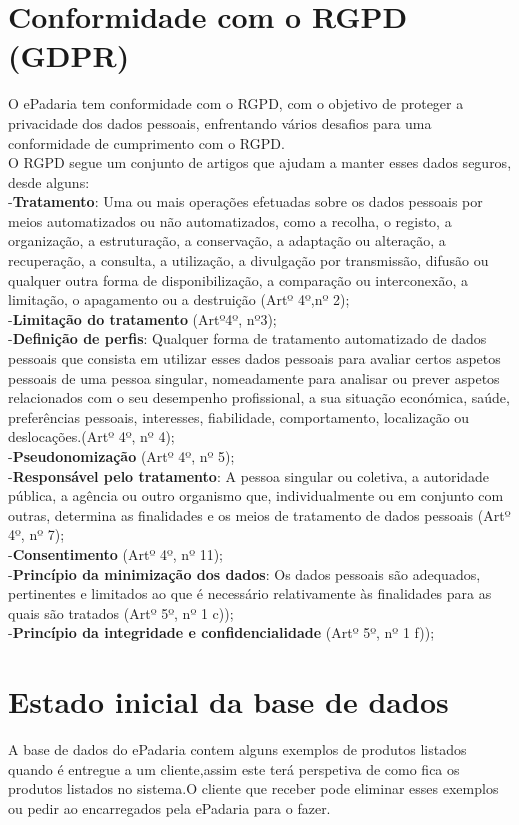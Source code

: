 \section{Conformidade com o RGPD (GDPR)}
O ePadaria tem conformidade com o RGPD, com o objetivo de proteger a privacidade dos dados pessoais, enfrentando vários desafios para uma conformidade de cumprimento com o RGPD.\\
O RGPD segue um conjunto de artigos que ajudam a manter esses dados seguros, desde alguns:\\
-\textbf{Tratamento}: Uma ou mais operações efetuadas sobre os dados pessoais por meios automatizados ou não automatizados, como a recolha, o registo, a organização, a estruturação, a
conservação, a adaptação ou alteração, a recuperação, a consulta, a utilização,
a divulgação por transmissão, difusão ou qualquer outra forma de
disponibilização, a comparação ou interconexão, a limitação, o apagamento
ou a destruição (Artº 4º,nº 2);\\
-\textbf{Limitação do tratamento} (Artº4º, nº3);\\
-\textbf{Definição de perfis}: Qualquer forma de tratamento automatizado de dados pessoais que consista
em utilizar esses dados pessoais para avaliar certos aspetos pessoais de uma
pessoa singular, nomeadamente para analisar ou prever aspetos relacionados
com o seu desempenho profissional, a sua situação económica, saúde,
preferências pessoais, interesses, fiabilidade, comportamento, localização ou
deslocações.(Artº 4º, nº 4); \\
-\textbf{Pseudonomização} (Artº 4º, nº 5);\\
-\textbf{Responsável pelo tratamento}: A pessoa singular ou coletiva, a autoridade pública, a agência ou outro organismo que, individualmente ou em conjunto com outras, determina as finalidades e os meios de tratamento de dados pessoais (Artº 4º, nº 7); \\
-\textbf{Consentimento} (Artº 4º, nº 11);\\
-\textbf{Princípio da minimização dos dados}: Os dados pessoais são adequados, pertinentes e limitados ao que é necessário relativamente às finalidades para as quais são tratados (Artº 5º, nº 1 c));\\
-\textbf{Princípio da integridade e confidencialidade} (Artº 5º, nº 1 f));\\

\section{Estado inicial da base de dados}
A base de dados do ePadaria contem alguns exemplos de produtos listados quando é entregue a um cliente,assim este terá perspetiva de como fica os produtos listados no sistema.O cliente que receber pode eliminar esses exemplos ou pedir ao encarregados pela ePadaria para o fazer.

